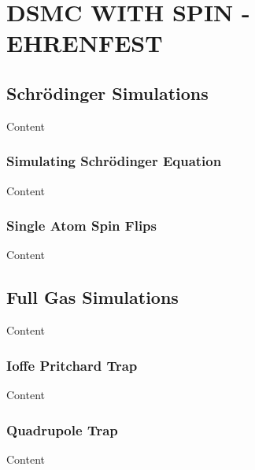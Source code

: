 
\chapter{DSMC WITH SPIN - EHRENFEST} %

\label{ch:dsmcehr} %


\section{Schr\"odinger Simulations}

Content


\subsection{Simulating Schr\"odinger Equation}

Content


\subsection{Single Atom Spin Flips}

Content


\section{Full Gas Simulations}

Content


\subsection{Ioffe Pritchard Trap}

Content


\subsection{Quadrupole Trap}

Content